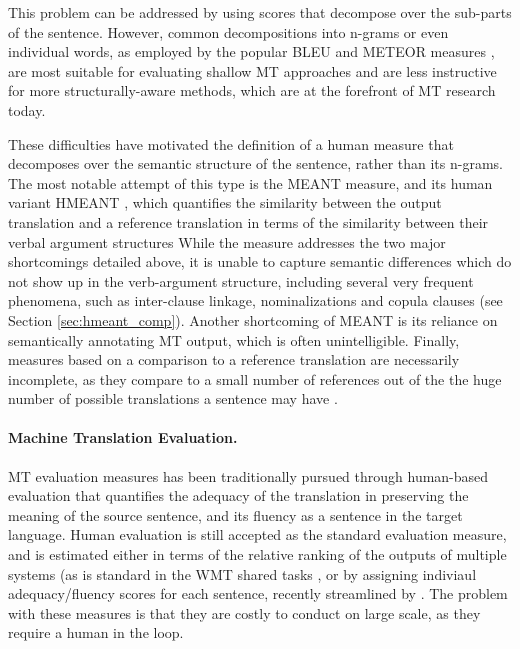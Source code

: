 \documentclass[11pt]{article}
\newcommand{\secref}[1]{Section \ref{#1}}
\begin{document}
This problem can be addressed by using scores that decompose over the sub-parts of the sentence. 
However, common decompositions into n-grams or even individual words, as employed by the
popular BLEU \cite{Papineni:2002} and METEOR measures \cite{Banerjee:2005},
are most suitable for evaluating shallow MT approaches and are
less instructive for more structurally-aware methods, which are at
the forefront of MT research today.

These difficulties have motivated the definition of a human measure that decomposes over
the semantic structure of the sentence, rather than its n-grams. The most notable attempt of
this type is the MEANT measure, and its human variant HMEANT
\cite{lo2010evaluating,lo2011structured,Lo2011meant,lo2013meant}, which quantifies the
similarity between the output translation and a reference translation in terms of the similarity
between their verbal argument structures
While the measure addresses the two major shortcomings
detailed above, it is unable to capture semantic differences which do not show up in
the verb-argument structure, including several very frequent phenomena, such as
inter-clause linkage, nominalizations and copula clauses
(see \secref{sec:hmeant_comp}).
Another shortcoming of MEANT is its reliance on semantically annotating MT output,
which is often unintelligible. Finally, measures based on a comparison to a
reference translation
are necessarily incomplete, as they compare to a small number of references
out of the the huge number of possible translations a sentence may have
\cite{dreyer2012hyter}.


\paragraph{Machine Translation Evaluation.}
MT evaluation measures has been traditionally pursued through human-based
evaluation that quantifies the adequacy of the translation in preserving the meaning
of the source sentence, and its fluency as a sentence in the target language.
Human evaluation is still accepted as the standard evaluation measure, and is
estimated either in terms of the relative ranking of the outputs of multiple systems
(as is standard in the WMT shared tasks \cite[inter alia]{wmt14}, or by assigning
indiviaul adequacy/fluency scores for each sentence, recently streamlined by .
The problem with these measures is that they are costly to conduct on large scale, as
they require a human in the loop.
\end{document}
